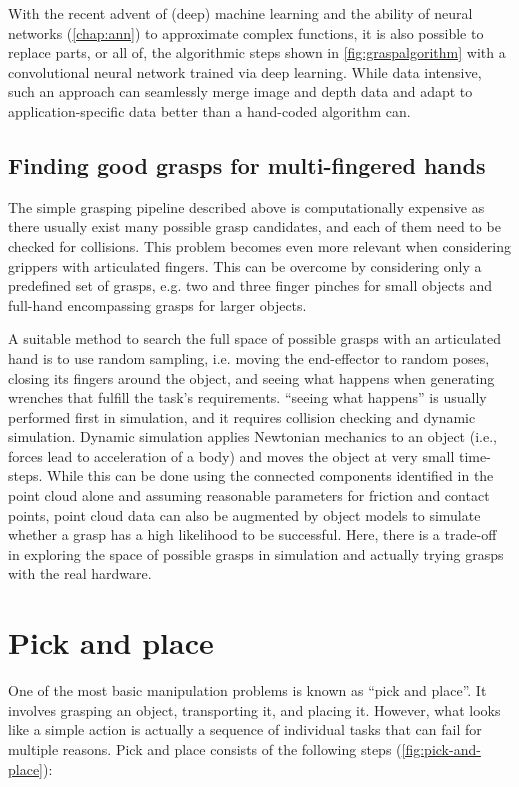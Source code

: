With the recent advent of (deep) machine learning and the ability of neural networks (\cref{chap:ann}) to approximate complex functions, it is also possible to replace parts, or all of, the algorithmic steps shown in \cref{fig:graspalgorithm} with a convolutional neural network trained via deep learning. While data intensive, such an approach can seamlessly merge image and depth data and adapt to application-specific data better than a hand-coded algorithm can.

\subsection{Finding good grasps for multi-fingered hands}

The simple grasping pipeline described above is computationally expensive as there usually exist many possible grasp candidates, and each of them need to be checked for collisions. This problem becomes even more relevant when considering grippers with articulated fingers. This can be overcome by considering only a predefined set of grasps, e.g. two and three finger pinches for small objects and full-hand encompassing grasps for larger objects.

A suitable method to search the full space of possible grasps with an articulated hand is to use random sampling, i.e. moving the end-effector to random poses, closing its fingers around the object, and seeing what happens when generating wrenches that fulfill the task's requirements.
``seeing what happens'' is usually performed first in simulation, and it requires collision checking and dynamic simulation. Dynamic simulation applies Newtonian mechanics to an object (i.e., forces lead to acceleration of a body) and moves the object at very small time-steps. While this can be done using the connected components identified in the point cloud alone and assuming reasonable parameters for friction and contact points, point cloud data can also be augmented by object models to simulate whether a grasp has a high likelihood to be successful. Here, there is a trade-off in exploring the space of possible grasps in simulation and actually trying grasps with the real hardware.

\section{Pick and place}

One of the most basic manipulation problems is known as ``pick and place''. It involves grasping an object, transporting it, and placing it.
However, what looks like a simple action is actually a sequence of individual tasks that can fail for multiple reasons. Pick and place consists of the following steps (\cref{fig:pick-and-place}):

